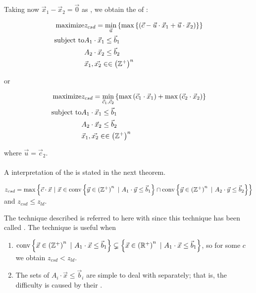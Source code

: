 Taking now $\vec{x}_1-\vec{x}_2=\vec{0}$ as , we obtain the  of :

\begin{eqnarray}
\mbox{maximize}&z_{csd}=\funa{\min_{\vec{u}}}{\funa{\max}{\brak{\vec{c}-\vec{u}\cdot\vec{x}_1+\vec{u}\cdot\vec{x}_2}}}\eqnlab{ripld-m}\\
\mbox{subject to}&A_1\cdot\vec{x}_1\leq\vec{b}_1\eqnlab{ripld-c1}\\
&A_2\cdot\vec{x}_2\leq\vec{b}_2\eqnlab{ripld-c2}\\
&\vec{x}_1,\vec{x_2}\in\in\brak{\ZZZ^+}^n\eqnlab{ripld-c3}
\end{eqnarray}

or

\begin{eqnarray}
\mbox{maximize}&z_{csd}=\funa{\min_{\vec{c}_1,\vec{c}_2}}{\fun{\max}{\vec{c}_1\cdot\vec{x}_1}+\fun{\max}{\vec{c}_2\cdot\vec{x}_2}}\eqnlab{ripld-m}\\
\mbox{subject to}&A_1\cdot\vec{x}_1\leq\vec{b}_1\eqnlab{ripld-c1}\\
&A_2\cdot\vec{x}_2\leq\vec{b}_2\eqnlab{ripld-c2}\\
&\vec{x}_1,\vec{x_2}\in\in\brak{\ZZZ^+}^n\eqnlab{ripld-c3}
\end{eqnarray}

where $\vec{u}=\vec{c}_2$.

\paragraph{}
A  interpretation of the  is stated in the next theorem.

\begin{theorem}
$z_{csd}=\max\left\{ \vec{c}\cdot\vec{x}\ |\ \vec{x}\in\mbox{conv}\left\{ \vec{y}\in\left( \mathbb{Z}^+ \right)^n\ |\ A_1\cdot\vec{y}\leq\vec{b}_1 \right\}\cap\mbox{conv}\left\{ \vec{y}\in\left( \mathbb{Z}^+ \right)^n\ |\ A_2\cdot\vec{y}\leq\vec{b}_2 \right\} \right\}$ and $z_{csd}\leq z_{ld}$.
\end{theorem}


The technique described is referred to here with  since this technique has been called . The technique is useful when

\begin{enumerate}
 \item $\mbox{conv}\left\{ \vec{x}\in\left( \mathbb{Z}^+ \right)^n\ |\ A_1\cdot\vec{x}\leq\vec{b}_1 \right\}\subsetneq\left\{ \vec{x}\in\left( \mathbb{R}^+ \right)^n\ |\ A_1\cdot\vec{x}\leq\vec{b}_1 \right\}$, so for some  $c$ we obtain $z_{csd}<z_{ld}$.
 \item The sets of  $A_i\cdot\vec{x}\leq\vec{b}_i$ are simple to deal with separately; that is, the difficulty is caused by their .
\end{enumerate}


